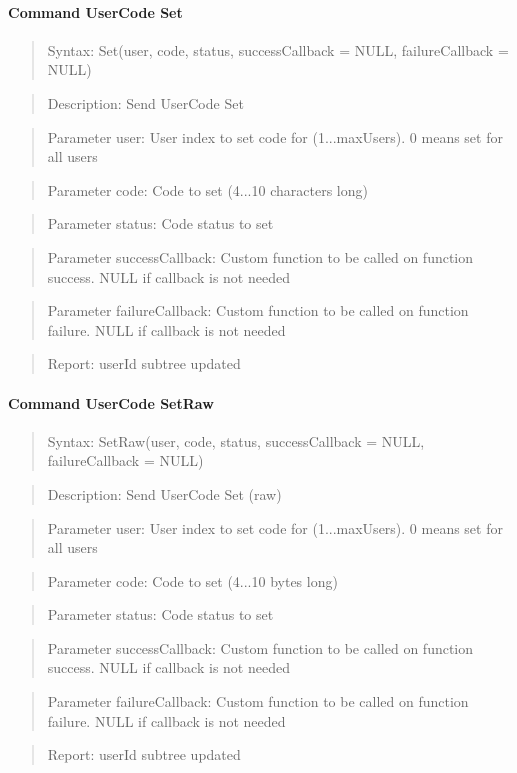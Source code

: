 \paragraph{Command UserCode Set}
\begin{quote}Syntax: Set(user, code, status, successCallback = NULL, failureCallback = NULL)\end{quote}
\begin{quote}Description: Send UserCode Set\end{quote}
\begin{quote}Parameter user: User index to set code for (1...maxUsers). 0 means set for all users\end{quote}
\begin{quote}Parameter code: Code to set (4...10 characters long)\end{quote}
\begin{quote}Parameter status: Code status to set\end{quote}
\begin{quote}Parameter successCallback: Custom function to be called on function success. NULL if callback is not needed\end{quote}
\begin{quote}Parameter failureCallback: Custom function to be called on function failure. NULL if callback is not needed\end{quote}
\begin{quote}Report: userId subtree updated\end{quote}

\paragraph{Command UserCode SetRaw}
\begin{quote}Syntax: SetRaw(user, code, status, successCallback = NULL, failureCallback = NULL)\end{quote}
\begin{quote}Description: Send UserCode Set (raw)\end{quote}
\begin{quote}Parameter user: User index to set code for (1...maxUsers). 0 means set for all users\end{quote}
\begin{quote}Parameter code: Code to set (4...10 bytes long)\end{quote}
\begin{quote}Parameter status: Code status to set\end{quote}
\begin{quote}Parameter successCallback: Custom function to be called on function success. NULL if callback is not needed\end{quote}
\begin{quote}Parameter failureCallback: Custom function to be called on function failure. NULL if callback is not needed\end{quote}
\begin{quote}Report: userId subtree updated\end{quote}


